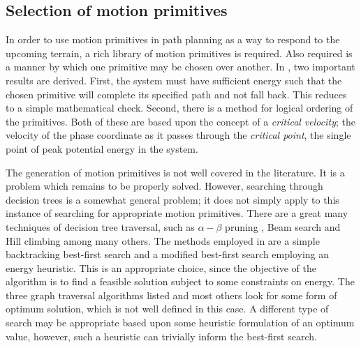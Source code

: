 \subsection{Selection of motion primitives}\label{sec:selection}
In order to use motion primitives in path planning as a way to respond to the upcoming terrain, a rich library of motion primitives is required. Also required is a manner by which one primitive may be chosen over another. In \cite{manchester13planning}, two important results are derived. First, the system must have sufficient energy such that the chosen primitive will complete its specified path and not fall back. This reduces to a simple mathematical check. Second, there is a method for logical ordering of the primitives. Both of these are based upon the concept of a \textit{critical velocity}; the velocity of the phase coordinate as it passes through the \textit{critical point}, the single point of peak potential energy in the system. 

The generation of motion primitives is not well covered in the literature. It is a problem which remains to be properly solved. However, searching through decision trees is a somewhat general problem; it does not simply apply to this instance of searching for appropriate motion primitives. There are a great many techniques of decision tree traversal, such as $\alpha-\beta$ pruning \cite{knuth1976analysis}, Beam search \cite{steinbiss1994improvements} and Hill climbing \cite{goldfeld1966maximization} among many others. The methods employed in \cite{manchester13planning} are a simple backtracking best-first search and a modified best-first search employing an energy heuristic. This is an appropriate choice, since the objective of the algorithm is to find a feasible solution subject to some constraints on energy. The three graph traversal algorithms listed and most others look for some form of optimum solution, which is not well defined in this case. A different type of search may be appropriate based upon some heuristic formulation of an optimum value, however, such a heuristic can trivially inform the best-first search.